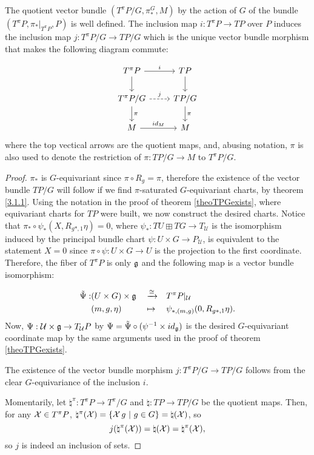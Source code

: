\begin{theorem}\label{theoTpiPGSubbundle}
The quotient vector bundle $(T^\pi P/G, \pi^G_*, M)$ by the action of $G$ of the bundle $(T^\pi P, \pi_*|_{T^\pi P}, P)$ is well defined. The inclusion map $i: T^\pi P \to TP$ over $P$ induces the inclusion map $j: T^\pi P/G \to TP/G$ which is the unique vector bundle morphism that makes the following diagram commute:

\begin{equation}
    \begin{tikzcd}
        T^\pi P \ar{r}{i} \ar{d} & TP \ar{d} \\
        T^\pi P/G \ar[dashed]{r}{j} \arrow{d}{\pi} & TP/G \arrow{d}{\pi} \\
        M \arrow{r}{id_M} & M
    \end{tikzcd}
\end{equation}
where the top vectical arrows are the quotient maps, and, abusing notation, $\pi$ is also used to denote the restriction of $\pi: TP/G \to M$ to $T^\pi P/G$.
\end{theorem}

\begin{proof}
$\pi_*$ is $G$-equivariant since $\pi \circ R_g = \pi$, therefore the existence of the vector bundle $TP/G$ will follow if we find $\pi$-saturated $G$-equivariant charts, by theorem \ref{3.1.1}. Using the notation in the proof of theorem \ref{theoTPGexists}, where equivariant charts for $TP$ were built, we now construct the desired charts. Notice that $\pi_* \circ \psi_* (X, R_{g*, 1} \eta) = 0$, where $\psi_* : TU \boxplus TG \to T_{\mathcal U}$ is the isomorphism induced by the principal bundle chart $\psi: U \times G \to P_{\mathcal U}$, is equivalent to the statement $X = 0$ since $\pi \circ \psi: U \times G \to U$ is the projection to the first coordinate. Therefore, the fiber of $T^\pi P$ is only $\mathfrak{g}$ and the following map is a vector bundle isomorphism:

\begin{align*}
    \Tilde \Psi :& (U \times G) \times \mathfrak{g} && \xrightarrow{\cong} && T^\pi P|_{\mathcal U} \\    
                 & (m, g, \eta)&& \mapsto &&\psi_{*, (m, g)}(0, R_{g*, 1} \eta).
\end{align*}
Now, $\Psi : \mathcal U \times \mathfrak{g}  \to  T_{\mathcal U}P$ by $\Psi = \Tilde \Psi \circ (\psi^{-1} \times id_{\mathfrak{g}})$ is the desired $G$-equivariant coordinate map by the same arguments used in the proof of theorem \ref{theoTPGexists}.

The existence of the vector bundle morphism $j: T^\pi P/G \to TP/G$ follows from the clear $G$-equivariance of the inclusion $i$.

Momentarily, let $\natural^\pi: T^\pi P \to T^\pi/G$ and $\natural: TP \to TP/G$ be the quotient maps. Then, for any $\mathcal{X} \in T^\pi P$, $\natural^\pi(\mathcal{X}) = \left\{ \mathcal{X} \, g \ |\  g \in G \right\} = \natural(\mathcal{X})$, so \[j(\natural^\pi(\mathcal{X})) = \natural(\mathcal{X}) = \natural^\pi(\mathcal{X}),\] so $j$ is indeed an inclusion of sets.
\end{proof}

